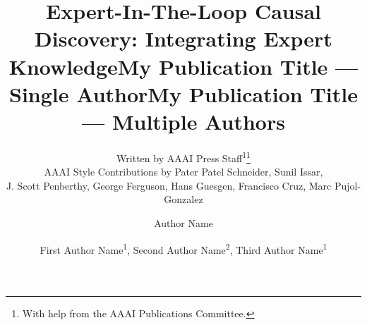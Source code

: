 \documentclass[letterpaper]{article} %
\title{Expert-In-The-Loop Causal Discovery: Integrating Expert Knowledge}
\author{
    Written by AAAI Press Staff\textsuperscript{\rm 1}\thanks{With help from the AAAI Publications Committee.}\\
    AAAI Style Contributions by Pater Patel Schneider,
    Sunil Issar,\\
    J. Scott Penberthy,
    George Ferguson,
    Hans Guesgen,
    Francisco Cruz\equalcontrib,
    Marc Pujol-Gonzalez\equalcontrib
}
\title{My Publication Title --- Single Author}
\author {
    Author Name
}
\title{My Publication Title --- Multiple Authors}
\author {
    First Author Name\textsuperscript{\rm 1},
    Second Author Name\textsuperscript{\rm 2},
    Third Author Name\textsuperscript{\rm 1}
}
\begin{document}
\maketitle

\begin{abstract}
\end{abstract}
\end{document}
